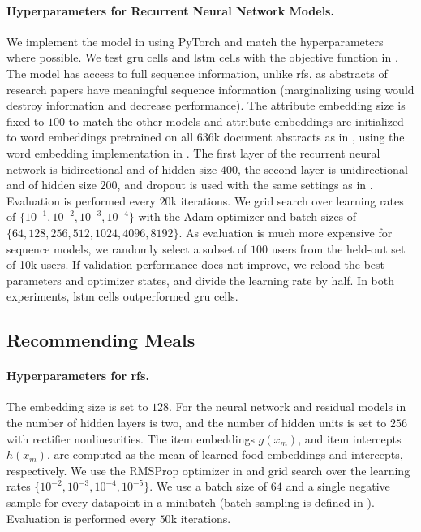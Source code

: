 \paragraph{Hyperparameters for Recurrent Neural Network Models.} We implement the model in \citet{bansal2016ask-the-gru:} using PyTorch and match the hyperparameters where possible. We test \gls{gru} cells and \gls{lstm} cells with the objective function in . The model has access to full sequence information, unlike \gls{rfs}, as abstracts of research papers have meaningful sequence information (marginalizing using  would destroy information and decrease performance). The attribute embedding size is fixed to $100$ to match the other models and attribute embeddings are initialized to word embeddings pretrained on all 636k document abstracts as in \citet{bansal2016ask-the-gru:}, using the word embedding implementation in \citet{bojanowski2017enriching}. The first layer of the recurrent neural network is bidirectional and of hidden size $400$, the second layer is unidirectional and of hidden size $200$, and dropout is used with the same settings as in \citet{bansal2016ask-the-gru:}. Evaluation is performed every $20$k iterations. We grid search over learning rates of $\{10^{-1}, 10^{-2}, 10^{-3}, 10^{-4}\}$ with the Adam optimizer \citep{kingma2015adam:} and batch sizes of $\{64, 128, 256, 512, 1024, 4096, 8192\}$. As evaluation is much more expensive for sequence models, we randomly select a subset of $100$ users from the held-out set of 10k users. If validation performance does not improve, we reload the best parameters and optimizer states, and divide the learning rate by half. In both experiments, \gls{lstm} cells outperformed \gls{gru} cells.

\subsection{Recommending Meals}
\paragraph{Hyperparameters for \gls{rfs}.} The embedding size is set to $128$. For the neural network and residual models in  the number of hidden layers is two, and the number of hidden units is set to $256$ with rectifier nonlinearities. The item embeddings $g(x_m)$, and item intercepts $h(x_m)$, are computed as the mean of learned food embeddings and intercepts, respectively. We use the RMSProp optimizer in \citet{graves2013generating} and grid search over the learning rates $\{10^{-2}, 10^{-3}, 10^{-4}, 10^{-5}\}$. We use a batch size of $64$ and a single negative sample for every datapoint in a minibatch (batch sampling is defined in ). Evaluation is performed every $50$k iterations.

